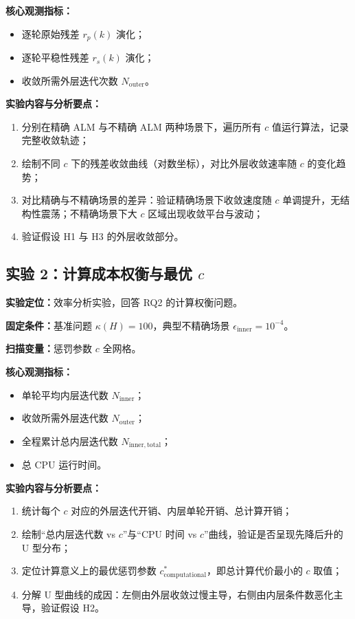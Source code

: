 \documentclass[UTF8]{ctexart}
\numberwithin{figure}{section}
\theoremstyle{definition}
\theoremstyle{examplestyle}
\theoremstyle{remark}
\begin{document}
\textbf{核心观测指标：}
\begin{itemize}
\item 逐轮原始残差 $r_p(k)$ 演化；
\item 逐轮平稳性残差 $r_s(k)$ 演化；
\item 收敛所需外层迭代次数 $N_{\mathrm{outer}}$。
\end{itemize}

\textbf{实验内容与分析要点：}
\begin{enumerate}
\item 分别在精确 ALM 与不精确 ALM 两种场景下，遍历所有 $c$ 值运行算法，记录完整收敛轨迹；
\item 绘制不同 $c$ 下的残差收敛曲线（对数坐标），对比外层收敛速率随 $c$ 的变化趋势；
\item 对比精确与不精确场景的差异：验证精确场景下收敛速度随 $c$ 单调提升，无结构性震荡；不精确场景下大 $c$ 区域出现收敛平台与波动；
\item 验证假设 H1 与 H3 的外层收敛部分。
\end{enumerate}

\subsection{实验 2：计算成本权衡与最优 $c$}
\label{sec:exp2}

\textbf{实验定位：}效率分析实验，回答 RQ2 的计算权衡问题。

\textbf{固定条件：}基准问题 $\kappa(H)=100$，典型不精确场景 $\epsilon_{\mathrm{inner}}=10^{-4}$。

\textbf{扫描变量：}惩罚参数 $c$ 全网格。

\textbf{核心观测指标：}
\begin{itemize}
\item 单轮平均内层迭代数 $N_{\mathrm{inner}}$；
\item 收敛所需外层迭代数 $N_{\mathrm{outer}}$；
\item 全程累计总内层迭代数 $N_{\mathrm{inner,total}}$；
\item 总 CPU 运行时间。
\end{itemize}

\textbf{实验内容与分析要点：}
\begin{enumerate}
\item 统计每个 $c$ 对应的外层迭代开销、内层单轮开销、总计算开销；
\item 绘制“总内层迭代数 vs $c$”与“CPU 时间 vs $c$”曲线，验证是否呈现先降后升的 U 型分布；
\item 定位计算意义上的最优惩罚参数 $c^*_{\mathrm{computational}}$，即总计算代价最小的 $c$ 取值；
\item 分解 U 型曲线的成因：左侧由外层收敛过慢主导，右侧由内层条件数恶化主导，验证假设 H2。
\end{enumerate}
\end{document}
